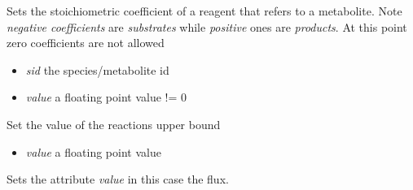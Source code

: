 \documentclass[a4paper,11pt,english]{sphinxmanual}
\begin{document}
\begin{fulllineitems}
\begin{fulllineitems}
\begin{itemize}
\end{itemize}

\end{fulllineitems}


\begin{fulllineitems}
\label{modules_doc:cbmpy.CBModel.Reaction.setStoichCoefficient}
Sets the stoichiometric coefficient of a reagent that refers to a metabolite. Note \emph{negative coefficients} are \emph{substrates}
while \emph{positive} ones are \emph{products}. At this point zero coefficients are not allowed
\begin{itemize}
\item {} 
\emph{sid} the species/metabolite id

\item {} 
\emph{value} a floating point value != 0

\end{itemize}

\end{fulllineitems}


\begin{fulllineitems}
\label{modules_doc:cbmpy.CBModel.Reaction.setUpperBound}
Set the value of the reactions upper bound
\begin{itemize}
\item {} 
\emph{value} a floating point value

\end{itemize}

\end{fulllineitems}


\begin{fulllineitems}
\label{modules_doc:cbmpy.CBModel.Reaction.setValue}
Sets the attribute \emph{value} in this case the flux.

\end{fulllineitems}


\end{fulllineitems}

\end{document}
